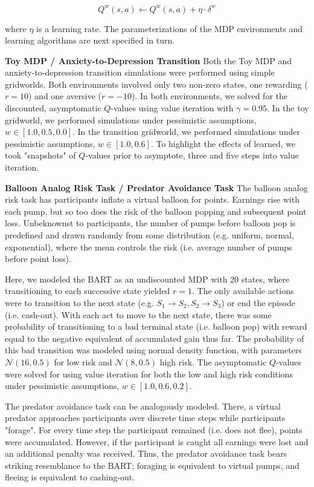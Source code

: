 \documentclass[11pt]{article} %
\begin{document}
\begin{equation*}
Q^w(s,a) \leftarrow Q^w(s,a) + \eta \cdot \delta^w
\end{equation*}

where $\eta$ is a learning rate. The parameterizations of the MDP environments and learning algorithms are next specified in turn.

\textbf{Toy MDP / Anxiety-to-Depression Transition} Both the Toy MDP and anxiety-to-depression transition simulations were performed using simple gridworlds. Both environments involved only two non-zero states, one rewarding ($r=10$) and one aversive ($r=-10$). In both environments, we solved for the discounted, asymptomatic $Q$-values using value iteration with $\gamma = 0.95$. In the toy gridworld, we performed simulations under pessimistic assumptions, $w \in [1.0, 0.5, 0.0]$. In the transition gridworld, we performed simulations under pessimistic assumptions, $w \in [1.0, 0.6]$. To highlight the effects of learned, we took "snapshots" of $Q$-values prior to asymptote, three and five steps into value iteration. 

\textbf{Balloon Analog Risk Task / Predator Avoidance Task} The balloon analog risk task \citep{Lejuez2002} has participants inflate a virtual balloon for points. Earnings rise with each pump, but so too does the risk of the balloon popping and subsequent point loss. Unbeknownst to participants, the number of pumps before balloon pop is predefined and drawn randomly from some distribution (e.g. uniform, normal, exponential), where the mean controls the risk (i.e. average number of pumps before point loss). 

Here, we modeled the BART as an undiscounted MDP with 20 states, where transitioning to each successive state yielded $r=1$. The only available actions were to transition to the next state (e.g. $S_1 \rightarrow S_2, S_2 \rightarrow S_3$) or end the episode (i.e. cash-out). With each act to move to the next state, there was some probability of transitioning to a bad terminal state (i.e. balloon pop) with reward equal to the negative equivalent of accumulated gain thus far. The probability of this bad transition was modeled using normal density function, with parameters $\mathcal{N}(16,0.5)$ for low risk and $\mathcal{N}(8,0.5)$ high risk. The asymptomatic $Q$-values were solved for using value iteration for both the low and high risk conditions under pessimistic assumptions, $w \in [1.0, 0.6, 0.2]$.

The predator avoidance task \citep{fung2019} can be analogously modeled. There, a virtual predator approaches participants over discrete time steps while participants "forage". For every time step the participant remained (i.e. does not flee), points were accumulated. However, if the participant is caught all earnings were lost and an additional penalty was received. Thus, the predator avoidance task bears striking resemblance to the BART; foraging is equivalent to virtual pumps, and fleeing is equivalent to cashing-out.
\end{document}
